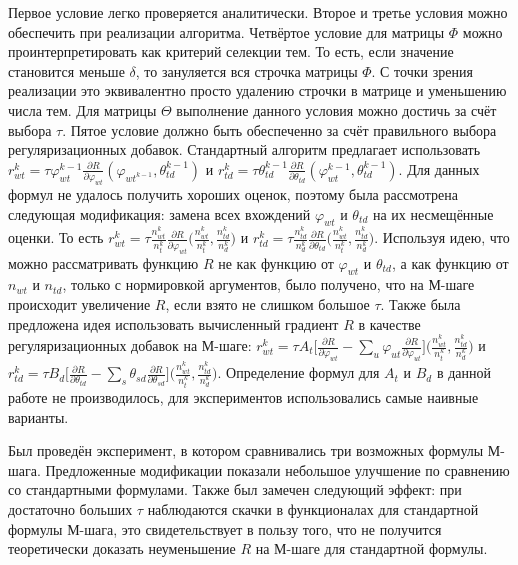 \documentclass[12pt]{article}
\renewcommand{\phi}{\varphi}
\begin{document}
Первое условие легко проверяется аналитически. Второе и третье условия можно обеспечить при реализации алгоритма. Четвёртое условие для матрицы $\Phi$ можно проинтерпретировать как критерий селекции тем. То есть, если значение становится меньше $\delta$, то зануляется вся строчка матрицы $\Phi$. С точки зрения реализации это эквивалентно просто удалению строчки в матрице и уменьшению числа тем. Для матрицы $\Theta$ выполнение данного условия можно достичь за счёт выбора $\tau$. Пятое условие должно быть обеспеченно за счёт правильного выбора регуляризационных добавок. Стандартный алгоритм предлагает использовать $r_{wt}^{k} = \tau \phi_{wt}^{k-1} \frac{\partial{R}}{\partial{\phi_{wt}}}(\phi_{wt^{k-1}}, \theta_{td}^{k-1})$ и $r_{td}^{k}=\tau  \theta_{td}^{k-1} \frac{\partial{R}}{\partial{\theta_{td}}}(\phi_{wt}^{k-1}, \theta_{td}^{k-1})$. Для данных формул не удалось получить хороших оценок, поэтому была рассмотрена следующая модификация: замена всех вхождений $\phi_{wt}$ и $\theta_{td}$ на их несмещённые оценки. То есть  $r_{wt}^k= \tau \frac{n^k_{wt}}{n^k_t}\frac{\partial{R}}{\partial{\phi_{wt}}}\bigl(\frac{n^k_{wt}}{n^k_t}, \frac{n^k_{td}}{n^k_d}\bigr)$ и $r_{td}^k= \tau \frac{n^k_{td}}{n^k_d}\frac{\partial{R}}{\partial{\theta_{td}}}\bigl(\frac{n^k_{wt}}{n^k_t}, \frac{n^k_{td}}{n^k_d}\bigr)$. Используя идею, что можно рассматривать функцию $R$ не как функцию от $\phi_{wt}$ и $\theta_{td}$, а как функцию от $n_{wt}$ и $n_{td}$, только с нормировкой аргументов, было получено, что на М-шаге происходит увеличение $R$, если взято не слишком большое $\tau$. Также была предложена идея использовать вычисленный градиент $R$ в качестве регуляризационных добавок на М-шаге: $r^k_{wt} = \tau A_t \bigl[{\frac{\partial{R}}{\partial{\phi_{wt}}} - \sum\limits_u \phi_{ut} \frac{\partial{R}}{\partial{\phi_{ut}}} }\bigr] \bigl(\frac{n^k_{wt}}{n^k_t}, \frac{n^k_{td}}{n^k_d}\bigr)$ и $r^k_{td} = \tau B_d \bigl[ {\frac{\partial{R}}{\partial{\theta_{td}}} - \sum\limits_s \theta_{sd} \frac{\partial{R}}{\partial{\theta_{sd}}} }\bigr] \bigl(\frac{n^k_{wt}}{n^k_t}, \frac{n^k_{td}}{n^k_d}\bigr)$. Определение формул для $A_t$ и $B_d$ в данной работе не производилось, для экспериментов использовались самые наивные варианты.

Был проведён эксперимент, в котором сравнивались три возможных формулы М-шага. Предложенные модификации показали небольшое улучшение по сравнению со стандартными формулами. Также был замечен следующий эффект: при достаточно больших $\tau$ наблюдаются скачки в функционалах для стандартной формулы М-шага, это свидетельствует в пользу того, что не получится теоретически доказать неуменьшение $R$ на М-шаге для стандартной формулы.
\end{document}
